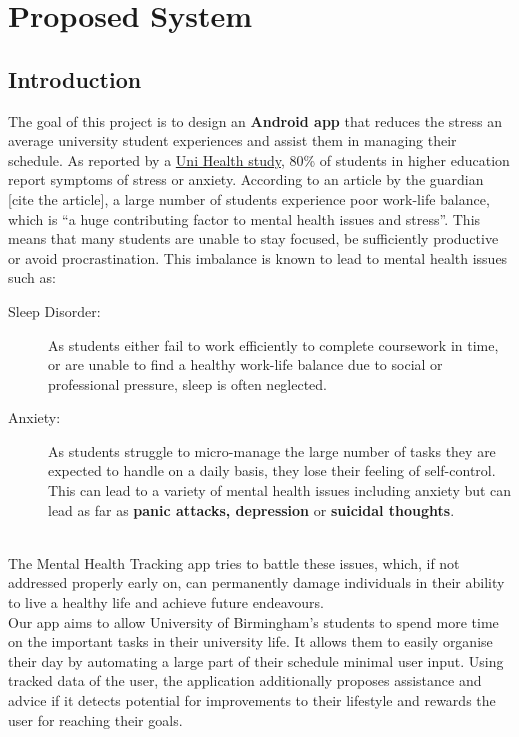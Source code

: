 \documentclass[a4paper,11pt]{article} %
\begin{document}
\newpage

\tableofcontents
\newpage

\section{Proposed System}
\subsection{Introduction}
The goal of this project is to design an \textbf{Android app} that reduces the stress an average university
 student experiences and assist them in managing their schedule. 
As reported by a \href{https://www.theguardian.com/education/2019/may/31/why-are-students-at-university-so-stressed}{Uni Health study}, 80\% of students in higher 
education report symptoms of stress or anxiety.
According to an article by the guardian [cite the article], a large number of students 
experience poor work-life balance, which is ``a huge contributing factor to mental health issues and stress''.
This means that many students are unable to stay focused, be sufficiently productive 
or avoid procrastination. This imbalance is known to lead to mental health issues such as:
\begin{description}
    \item[Sleep Disorder:] As students either fail to work efficiently to complete coursework 
    in time, or are unable to find a healthy work-life balance due to social or professional 
    pressure, sleep is often neglected.
    \item[Anxiety:] As students struggle to micro-manage the large number of tasks they are 
    expected to handle on a daily basis, they lose their feeling of self-control. This can 
    lead to a variety of mental health issues including anxiety but can lead as far 
    as \textbf{panic attacks, depression} or \textbf{suicidal thoughts}.
\end{description}
\ \\
The Mental Health Tracking app tries to battle these issues, which, if not addressed properly early on, 
can permanently damage individuals in their ability to live a healthy life and achieve future endeavours.\\

Our app aims to allow University of Birmingham’s students to spend more time on the important tasks in 
their university life. It allows them to easily organise their day by automating a large part of their 
schedule minimal user input.  
Using tracked data of the user, the application additionally proposes assistance and advice if it 
detects potential for improvements to their lifestyle and rewards the user for reaching their goals. 
\end{document}

